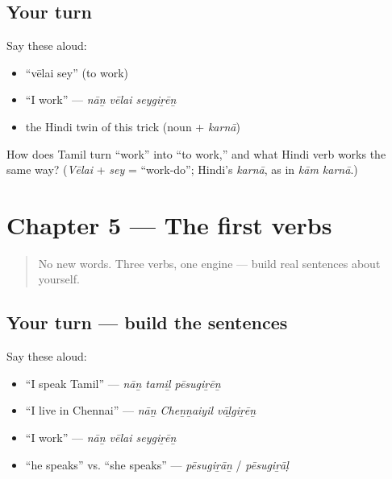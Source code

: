 \subsection*{Your turn}
Say these aloud:

\begin{itemize}
\raggedright
  \item \textquotedblleft{}vēlai sey\textquotedblright{} (to work)
  \item \textquotedblleft{}I work\textquotedblright{} — \emph{nāṉ vēlai seygiṟēṉ}
  \item the Hindi twin of this trick (noun + \emph{karnā})
\end{itemize}

\begin{tcolorbox}[breakable,colback=teal!4,colframe=teal!35!black,title={Before you move on}]
How does Tamil turn \textquotedblleft{}work\textquotedblright{} into \textquotedblleft{}to work,\textquotedblright{} and what Hindi verb works the same way? (\emph{Vēlai} + \emph{sey} = \textquotedblleft{}work-do\textquotedblright{}; Hindi's \emph{karnā}, as in \emph{kām karnā}.)
\end{tcolorbox}
\section[Practice]{Chapter 5 — The first verbs}

\label{lesson:TA-C05-practice}



\begin{quote}
No new words. Three verbs, one engine — build real sentences about yourself.
\end{quote}

\subsection*{Your turn — build the sentences}
Say these aloud:

\begin{itemize}
\raggedright
  \item \textquotedblleft{}I speak Tamil\textquotedblright{} — \emph{nāṉ tamiḻ pēsugiṟēṉ}
  \item \textquotedblleft{}I live in Chennai\textquotedblright{} — \emph{nāṉ Cheṉṉaiyil vāḻgiṟēṉ}
  \item \textquotedblleft{}I work\textquotedblright{} — \emph{nāṉ vēlai seygiṟēṉ}
  \item \textquotedblleft{}he speaks\textquotedblright{} vs. \textquotedblleft{}she speaks\textquotedblright{} — \emph{pēsugiṟāṉ} / \emph{pēsugiṟāḷ}
\end{itemize}

